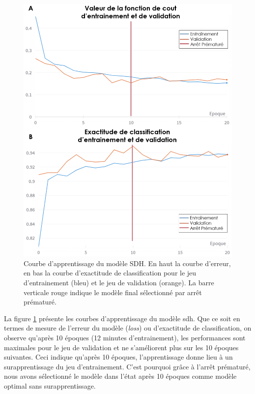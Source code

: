 \begin{figure}[!ht]
 \centering
 \includegraphics[width=1\textwidth]{figures/training_sdh.png}
 \caption[Courbe d'apprentissage du modèle SDH]{Courbe d'apprentissage du modèle SDH. En haut la courbe d'erreur, en bas la courbe d'exactitude de classification pour le jeu d'entrainement (bleu) et le jeu de validation (orange). La barre verticale rouge indique le modèle final sélectionné par arrêt prématuré.}
 \label{fig:sdh_train}
\end{figure}

La figure \ref{fig:sdh_train} présente les courbes d'apprentissage du modèle \gls{sdh}. Que ce soit en termes de mesure de l'erreur du modèle (\textit{loss}) ou d'exactitude de classification, on observe qu'après 10 époques (12 minutes d'entrainement), les performances sont maximales pour le jeu de validation et ne s'améliorent plus sur les 10 époques suivantes. Ceci indique qu'après 10 époques, l'apprentissage donne lieu à un surapprentissage du jeu d'entrainement. C'est pourquoi grâce à l'arrêt prématuré, nous avons sélectionné le modèle dans l'état après 10 époques comme modèle optimal sans surapprentissage.

